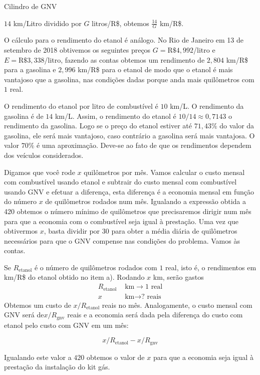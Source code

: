 \begin{answer}{Cilindro de GNV}
{$14$ km/Litro  dividido por $G$ litros/R\$, obtemos $\frac{14}{G}$ km/R\$.

O cálculo para o rendimento do etanol é análogo. No Rio de Janeiro em 13 de setembro de 2018 obtivemos os seguintes preços $G = \text{R\$ }4,992$/litro e $E = \text{R\$ }3,338$/litro, fazendo as contas obtemos um rendimento de $2{,}804$ km/R\$ para a gasolina e $2{,}996$ km/R\$ para o etanol de modo que o etanol é mais vantajoso que a gasolina, nas condições dadas porque anda mais quilômetros com $1$ real.

O rendimento do etanol por litro de combustível é $10$ km/L. O rendimento da gasolina é de $14$ km/L. Assim, o rendimento do etanol é $10/14 \approx 0{,}7143$ o rendimento da gasolina. Logo se o preço do etanol estiver até $71{,}43\%$ do valor da gasolina, ele será mais vantajoso, caso contrário a gasolina será mais vantajosa. O valor $70\%$ é uma aproximação. Deve-se ao fato de que os rendimentos dependem dos veículos considerados.

Digamos que você rode $x$ quilômetros por mês. Vamos calcular o custo mensal com combustível usando etanol e subtrair do custo mensal com combustível usando GNV e efetuar a diferença, esta diferença é a economia mensal em função do número $x$ de quilômetros rodados num mês. Igualando a expressão obtida a 420 obtemos o número mínimo de quilômetros que precisaremos dirigir num mês para que a economia com o combustível seja igual à prestação. Uma vez que obtivermos $x$, basta dividir por 30 para obter a média diária de quilômetros necessários para que o GNV compense nas condições do problema. Vamos às contas.

Se $R_\text{etanol}$ é o número de quilômetros rodados com $1$ real, isto é, o  rendimentos em km/R\$ do etanol obtido no item a). Rodando $x$ km, serão gastos
\begin{equation*}
\begin{split}R_\text{etanol}&\text{ km} \longrightarrow 1\text{ real}\\
x&\text{ km} \longrightarrow \text{? reais}
\end{split}
\end{equation*}
Obtemos um custo de $x/R_\text{etanol}$ reais no mês. Analogamente, o custo mensal com GNV será de$ x/R_\text{gnv}$ reais e a economia será dada pela diferença do custo com etanol pelo custo com GNV em um mês:

$$x/R_\text{etanol} - x/R_\text{gnv}$$

Igualando este valor a $420$ obtemos o valor de $x$ para que a economia seja igual à prestação da instalação do kit gás.

}
\end{answer}
